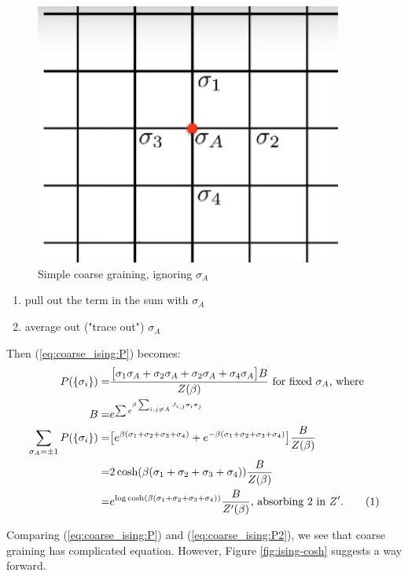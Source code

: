 \documentclass[]{article}
\newcommand\numberthis{\addtocounter{equation}{1}\tag{\theequation}}
\begin{document}
\begin{figure}[H]
	\caption{Simple coarse graining, ignoring $\sigma_A$}\label{fig:ising-coarse1}
	\includegraphics[width=0.9\textwidth]{ising-coarse1}
\end{figure}

\begin{enumerate}
	\item pull out the term in the sum with $\sigma_A$
	\item average out ("trace out") $\sigma_A$
\end{enumerate}
Then (\ref{eq:coarse_ising:P}) becomes:
\begin{align*}
P(\{\sigma_i\}) =& \frac{\big[\sigma_1\sigma_A + \sigma_2\sigma_A + \sigma_2\sigma_A + \sigma_4\sigma_A\big]B}{Z(\beta)} \text{ for fixed $\sigma_A$, where}\\
B =& e^{\sum e^{\beta \sum_{i,j \ne A} J_{i,j} \sigma_i \sigma_j}}\\
\sum_{\sigma_A=\pm 1} P(\{\sigma_i\}) =& \big[e^{\beta(\sigma_1+\sigma_2+\sigma_3+\sigma_4)} + e^{-\beta(\sigma_1+\sigma_2+\sigma_3+\sigma_4)}\big]  \frac{B}{Z(\beta)}\\
=& 2 \cosh({\beta(\sigma_1+\sigma_2+\sigma_3+\sigma_4)})   \frac{B}{Z(\beta)}\\
=& e^{\log{\cosh({\beta(\sigma_1+\sigma_2+\sigma_3+\sigma_4)})}} \frac{B}{Z^\prime(\beta)} \text{, absorbing $2$ in $Z^{\prime}$.} \numberthis \label{eq:coarse_ising:P2}
\end{align*}

Comparing (\ref{eq:coarse_ising:P}) and (\ref{eq:coarse_ising:P2}), we see that coarse graining has complicated equation. However, Figure \ref{fig:ising-cosh} suggests a way forward.
\end{document}
